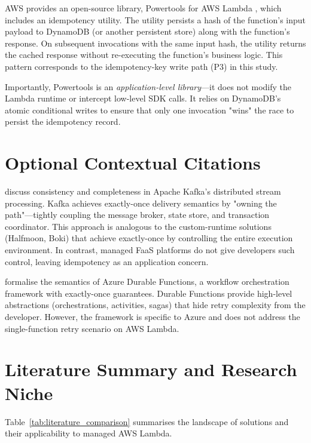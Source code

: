 AWS provides an open-source library, Powertools for AWS Lambda \citep{AWSPowertoolsDocs}, which includes an idempotency utility. The utility persists a hash of the function's input payload to DynamoDB (or another persistent store) along with the function's response. On subsequent invocations with the same input hash, the utility returns the cached response without re-executing the function's business logic. This pattern corresponds to the idempotency-key write path (P3) in this study.

Importantly, Powertools is an \textit{application-level library}---it does not modify the Lambda runtime or intercept low-level SDK calls. It relies on DynamoDB's atomic conditional writes to ensure that only one invocation "wins" the race to persist the idempotency record.

\section{Optional Contextual Citations}

\citet{Wang2021Kafka} discuss consistency and completeness in Apache Kafka's distributed stream processing. Kafka achieves exactly-once delivery semantics by "owning the path"---tightly coupling the message broker, state store, and transaction coordinator. This approach is analogous to the custom-runtime solutions (Halfmoon, Boki) that achieve exactly-once by controlling the entire execution environment. In contrast, managed FaaS platforms do not give developers such control, leaving idempotency as an application concern.

\citet{Burckhardt2021DurableFunctions} formalise the semantics of Azure Durable Functions, a workflow orchestration framework with exactly-once guarantees. Durable Functions provide high-level abstractions (orchestrations, activities, sagas) that hide retry complexity from the developer. However, the framework is specific to Azure and does not address the single-function retry scenario on AWS Lambda.

\section{Literature Summary and Research Niche}

Table~\ref{tab:literature_comparison} summarises the landscape of solutions and their applicability to managed AWS Lambda.

